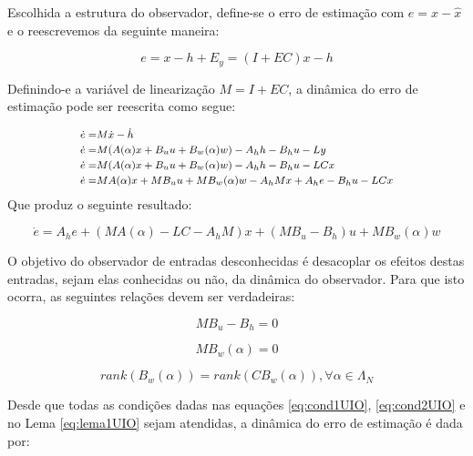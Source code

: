Escolhida a estrutura do observador, define-se o erro de estimação com $e=x-\hat{x}$ e o reescrevemos da seguinte maneira:

\begin{equation}
    e=x-h+E_y = (I+EC)x-h
\end{equation}

Definindo-e a variável de linearização $M=I+EC$, a dinâmica do erro de estimação pode ser reescrita como segue:

\begin{equation} \footnotesize
    \begin{split}
        \dot{e}=&M\dot{x}-\dot{h}\\
        \dot{e}=&M(A(\alpha)x+B_uu+B_w(\alpha)w)-A_hh-B_hu-Ly\\
        \dot{e}=&M(A(\alpha)x+B_uu+B_w(\alpha)w)-A_hh-B_hu-LCx\\
        \dot{e}=&MA(\alpha)x+MB_uu+MB_w(\alpha)w-A_hMx+A_he-B_hu-LCx\\
    \end{split}   
\end{equation}
\normalsize
Que produz o seguinte resultado:

\begin{equation} 
    \dot{e}=A_he+(MA(\alpha)-LC-A_hM)x+(MB_u-B_h)u+MB_w(\alpha)w
\end{equation}

O objetivo do observador de entradas desconhecidas é desacoplar os efeitos destas entradas, sejam elas conhecidas ou não, da dinâmica do observador. Para que isto ocorra, as seguintes relações devem ser verdadeiras:

\begin{equation} \label{eq:cond1UIO}
    MB_u-B_h=0    
\end{equation}

\begin{equation} \label{eq:cond2UIO}
    MB_w(\alpha)=0
\end{equation}

\begin{lema} \label{eq:lema1UIO}
    \begin{equation} 
        rank(B_w(\alpha))=rank(CB_w(\alpha)), \forall\alpha \in \Lambda_N
    \end{equation}    
\end{lema}

Desde que todas as condições dadas nas equações \ref{eq:cond1UIO}, \ref{eq:cond2UIO} e no Lema \ref{eq:lema1UIO} sejam atendidas, a dinâmica do erro de estimação é dada por:

